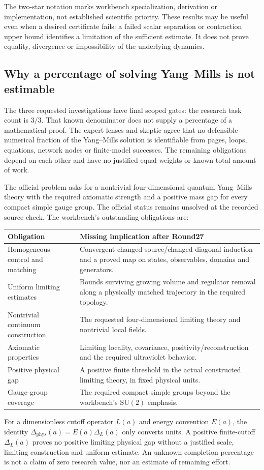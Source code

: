 \endgroup
The two-star notation marks workbench specialization, derivation or implementation, not established scientific priority. These results may be useful even when a desired certificate fails: a failed scalar separation or contraction upper bound identifies a limitation of the sufficient estimate. It does not prove equality, divergence or impossibility of the underlying dynamics.

\subsection{Why a percentage of solving Yang--Mills is not estimable}
The three requested investigations have final scoped gates: the research task count is $3/3$. That known denominator does not supply a percentage of a mathematical proof. The expert lenses and skeptic agree that no defensible numerical fraction of the Yang--Mills solution is identifiable from pages, loops, equations, network nodes or finite-model successes. The remaining obligations depend on each other and have no justified equal weights or known total amount of work.

The official problem asks for a nontrivial four-dimensional quantum Yang--Mills theory with the required axiomatic strength and a positive mass gap for every compact simple gauge group. The official status remains unsolved at the recorded source check. The workbench's outstanding obligations are:
\begin{center}\small
\begin{tabularx}{\textwidth}{@{}p{48mm}X@{}}
\toprule Obligation & Missing implication after Round27 \\
\midrule
Homogeneous control and matching & Convergent changed-source/changed-diagonal induction and a proved map on states, observables, domains and generators. \\
Uniform limiting estimates & Bounds surviving growing volume and regulator removal along a physically matched trajectory in the required topology. \\
Nontrivial continuum construction & The requested four-dimensional limiting theory and nontrivial local fields. \\
Axiomatic properties & Limiting locality, covariance, positivity/reconstruction and the required ultraviolet behavior. \\
Positive physical gap & A positive finite threshold in the actual constructed limiting theory, in fixed physical units. \\
Gauge-group coverage & The required compact simple groups beyond the workbench's $\mathrm{SU}(2)$ emphasis. \\
\bottomrule
\end{tabularx}
\end{center}
For a dimensionless cutoff operator $L(a)$ and energy convention $E(a)$, the identity
$\Delta_{\mathrm{phys}}(a)=E(a)\Delta_L(a)$ only converts units. A positive finite-cutoff $\Delta_L(a)$ proves no positive limiting physical gap without a justified scale, limiting construction and uniform estimate. An unknown completion percentage is not a claim of zero research value, nor an estimate of remaining effort.

